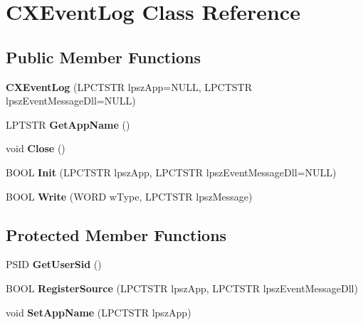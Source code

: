 \hypertarget{classCXEventLog}{\section{C\-X\-Event\-Log Class Reference}
\label{classCXEventLog}
}
\subsection*{Public Member Functions}
\begin{DoxyCompactItemize}
\item 
\hypertarget{classCXEventLog_abe2e555b2eae7e742e48fffe1673a8ad}{{\bfseries C\-X\-Event\-Log} (L\-P\-C\-T\-S\-T\-R lpsz\-App=N\-U\-L\-L, L\-P\-C\-T\-S\-T\-R lpsz\-Event\-Message\-Dll=N\-U\-L\-L)}\label{classCXEventLog_abe2e555b2eae7e742e48fffe1673a8ad}

\item 
\hypertarget{classCXEventLog_a2aaa533aa0156052c0d5b8df32758517}{L\-P\-T\-S\-T\-R {\bfseries Get\-App\-Name} ()}\label{classCXEventLog_a2aaa533aa0156052c0d5b8df32758517}

\item 
\hypertarget{classCXEventLog_ab7bf49cddde2acdcb26ae1d88e7906df}{void {\bfseries Close} ()}\label{classCXEventLog_ab7bf49cddde2acdcb26ae1d88e7906df}

\item 
\hypertarget{classCXEventLog_ab9a2685dde8c32223301d937fa087890}{B\-O\-O\-L {\bfseries Init} (L\-P\-C\-T\-S\-T\-R lpsz\-App, L\-P\-C\-T\-S\-T\-R lpsz\-Event\-Message\-Dll=N\-U\-L\-L)}\label{classCXEventLog_ab9a2685dde8c32223301d937fa087890}

\item 
\hypertarget{classCXEventLog_a9e888e720f0060f76628b9c4e39a679b}{B\-O\-O\-L {\bfseries Write} (W\-O\-R\-D w\-Type, L\-P\-C\-T\-S\-T\-R lpsz\-Message)}\label{classCXEventLog_a9e888e720f0060f76628b9c4e39a679b}

\end{DoxyCompactItemize}
\subsection*{Protected Member Functions}
\begin{DoxyCompactItemize}
\item 
\hypertarget{classCXEventLog_a41a24f017ba580d05f5c4249f80ca03a}{P\-S\-I\-D {\bfseries Get\-User\-Sid} ()}\label{classCXEventLog_a41a24f017ba580d05f5c4249f80ca03a}

\item 
\hypertarget{classCXEventLog_a02634a6ebd90f0a91fd9de283b63ab56}{B\-O\-O\-L {\bfseries Register\-Source} (L\-P\-C\-T\-S\-T\-R lpsz\-App, L\-P\-C\-T\-S\-T\-R lpsz\-Event\-Message\-Dll)}\label{classCXEventLog_a02634a6ebd90f0a91fd9de283b63ab56}

\item 
\hypertarget{classCXEventLog_a93795fcdd1820a5a30d38b4998a8a406}{void {\bfseries Set\-App\-Name} (L\-P\-C\-T\-S\-T\-R lpsz\-App)}\label{classCXEventLog_a93795fcdd1820a5a30d38b4998a8a406}

\end{DoxyCompactItemize}
